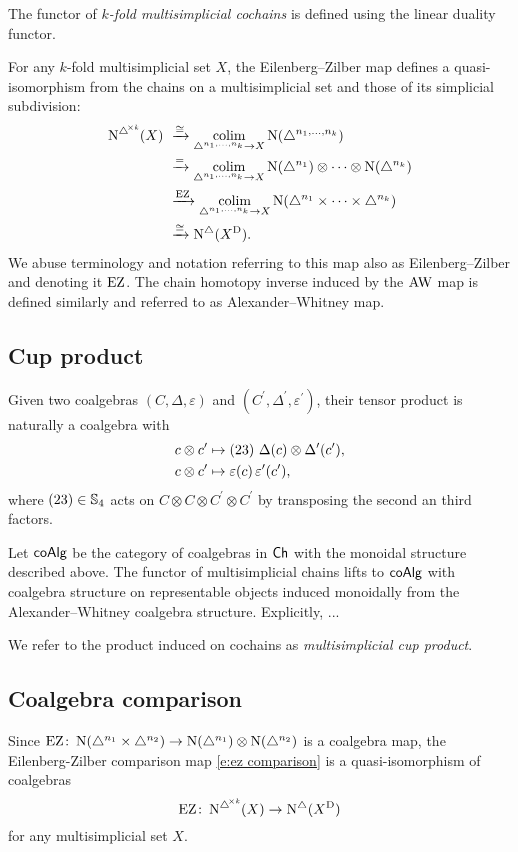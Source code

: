 The functor of \textit{$k$-fold multisimplicial cochains} is defined using the linear duality functor.

For any $k$-fold multisimplicial set $X$, the Eilenberg--Zilber map defines a quasi-isomorphism from the chains on a multisimplicial set and those of its simplicial subdivision:
\begin{equation} \label{e:ez comparison}
\begin{split}
\mchainsk(X) \ &\xra{\cong}
\colim_{\simplex^{n_1, \dots, n_k} \to X} \chains (\simplex^{n_1, \dots, n_k}) \\ &\xra{=}
\colim_{\simplex^{n_1, \dots, n_k} \to X} \chains(\simplex^{n_1}) \ot \dotsb \ot \chains(\simplex^{n_k}) \\ &\xra{\EZ}
\colim_{\simplex^{n_1, \dots, n_k} \to X} \chains(\simplex^{n_1} \times \dots \times \simplex^{n_k}) \\ &\xra{\cong}
\schains(X^{\diag}).
\end{split}
\end{equation}
We abuse terminology and notation referring to this map also as Eilenberg--Zilber and denoting it $\EZ$.
The chain homotopy inverse induced by the $\AW$ map is defined similarly and referred to as Alexander--Whitney map.

\subsection{Cup product}

Given two coalgebras $(C, \Delta, \varepsilon)$ and $(C^\prime, \Delta^\prime, \varepsilon^\prime)$, their tensor product is naturally a coalgebra with
\[
\begin{split}
c \ot c^\prime &\mapsto (23) \ \Delta(c) \otimes \Delta^\prime(c^\prime), \\
c \ot c^\prime &\mapsto \varepsilon(c) \, \varepsilon^\prime(c^\prime),
\end{split}
\]
where $(23) \in \S_4$ acts on $C \otimes C \otimes C^\prime \otimes C^\prime$ by transposing the second an third factors.

Let $\coAlg$ be the category of coalgebras in $\Ch$ with the monoidal structure described above.
The functor of multisimplicial chains lifts to $\coAlg$ with coalgebra structure on representable objects induced monoidally from the Alexander--Whitney coalgebra structure.
Explicitly, ...

We refer to the product induced on cochains as \textit{multisimplicial cup product}.

\subsection{Coalgebra comparison}

Since $\EZ \colon \chains(\simplex^{n_1} \times \simplex^{n_2}) \to \chains(\simplex^{n_1}) \ot \chains(\simplex^{n_2})$ is a coalgebra map, the Eilenberg-Zilber comparison map \eqref{e:ez comparison} is a quasi-isomorphism of coalgebras
\[
\EZ \colon \mchainsk(X) \to \schains(X^{\diag})
\]
for any multisimplicial set $X$.